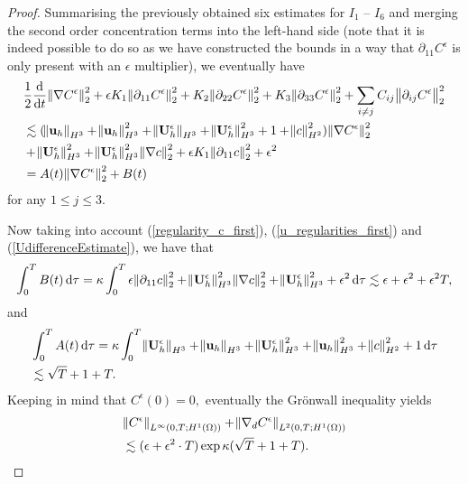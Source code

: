 \documentclass[11pt, a4paper]{article}
\newcommand*\diff{\mathop{}\!\mathrm{d}}
\begin{document}
\begin{proof}
\bigskip

Summarising the previously obtained six estimates for $I_1$ -- $I_6$ and merging the second order concentration terms into the left-hand side (note that it is indeed possible to do so as we have constructed the bounds in a way that $\partial_{11} C^\epsilon$ is only present with an $\epsilon$ multiplier), we eventually have
%
\begin{equation}
\begin{split}
& \frac{1}{2} \frac{\diff}{\diff t} \norm{\nabla C^\epsilon}_2^2 + \epsilon K_1 \norm{\partial_{11} C^\epsilon}_2^2 + K_2 \norm{\partial_{22} C^\epsilon}_2^2 + K_3 \norm{\partial_{33} C^\epsilon}_2^2 + \sum_{i \neq j} C_{ij} \norm{\partial_{ij} C^\epsilon}_2^2 \\
& \lesssim (\norm{\mathbf{u}_h}_{H^3} + \norm{\mathbf{u}_h}_{H^3}^2 + \norm{\mathbf{U}_h^\epsilon}_{H^3} + \norm{\mathbf{U}_h^\epsilon}_{H^3}^2 + 1 + \norm{c}_{H^2}^2) \norm{\nabla C^\epsilon}_2^2 \\
& + \norm{\mathbf{U}_h^\epsilon}_{H^3}^2 + \norm{\mathbf{U}_h^\epsilon}_{H^3}^2 \norm{\nabla c}_2^2 + \epsilon K_1 \norm{\partial_{11} c}_2^2 + \epsilon^2 \\
& = A(t) \norm{\nabla C^\epsilon}_2^2 + B(t) \raisetag{40pt}
\end{split}
\end{equation}
%
for any $1 \leq j \leq 3.$

Now taking into account (\ref{regularity_c_first}), (\ref{u_regularities_first}) and (\ref{UdifferenceEstimate}), we have that
%
\[ \int_0^T B(t) \diff \tau = \kappa \int_0^T \epsilon \norm{\partial_{11} c}_2^2 + \norm{\mathbf{U}_h^\epsilon}_{H^3}^2 \norm{\nabla c}_2^2 + \norm{\mathbf{U}_h^\epsilon}_{H^3}^2 + \epsilon^2 \diff \tau \lesssim \epsilon + \epsilon^2 + \epsilon^2 T,\]
%
and
%
\begin{equation}
\begin{split}
& \int_0^T A(t) \diff \tau = \kappa \int_0^T \norm{\mathbf{U}_h^\epsilon}_{H^3} + \norm{\mathbf{u}_h}_{H^3} + \norm{\mathbf{U}_h^\epsilon}_{H^3}^2 + \norm{\mathbf{u}_h}_{H^3}^2 + \norm{c}_{H^2}^2 + 1 \diff \tau \\
& \lesssim \sqrt{T} + 1 + T.
\end{split}
\end{equation}
%
Keeping in mind that $C^\epsilon(0) = 0,$ eventually the Gr\"onwall inequality yields
%
\begin{equation} \label{finalboundforCepsilon}
\begin{split}
& \norm{C^\epsilon}_{L^\infty(0,T; H^1(\Omega))} + \norm{\nabla_d C^\epsilon}_{L^2(0,T; H^1(\Omega))} \\
& \lesssim (\epsilon + \epsilon^2 \cdot T) \exp{\kappa (\sqrt{T} + 1 + T)}.
\end{split}
\end{equation}


\end{proof}
\end{document}
